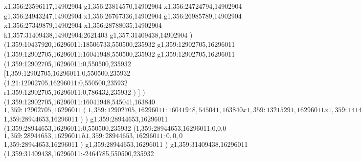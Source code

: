 {x1,356:23596117,14902904
g1,356:23814570,14902904
x1,356:24724794,14902904
g1,356:24943247,14902904
x1,356:26767336,14902904
g1,356:26985789,14902904
x1,356:27349879,14902904
x1,356:28788035,14902904
k1,357:31409438,14902904:2621403
g1,357:31409438,14902904
)
(1,359:10437920,16296011:18506733,550500,235932
g1,359:12902705,16296011
(1,359:12902705,16296011:16041948,550500,235932
g1,359:12902705,16296011
(1,359:12902705,16296011:0,550500,235932
[1,359:12902705,16296011:0,550500,235932
(1,21:12902705,16296011:0,550500,235932
r1,359:12902705,16296011:0,786432,235932
)
]
)
(1,359:12902705,16296011:16041948,545041,163840
$1,359:12902705,16296011
(1,359:12902705,16296011:16041948,545041,163840
x1,359:13215291,16296011
x1,359:14146295,16296011
g1,359:14328335,16296011
x1,359:14838061,16296011
g1,359:15020101,16296011
x1,359:15340956,16296011
x1,359:16318990,16296011
g1,359:16464622,16296011
x1,359:16974348,16296011
g1,359:17119980,16296011
[1,359:17119980,16296011:391398,545041,127431
(1,359:17261069,16123068:0,372098,0
x1,359:17588750,16123068
)
(1,359:17119980,16296011:391398,455111,127431
x1,359:17440835,16296011
)
]
x1,359:17766241,16296011
[1,359:17766241,16296011:397765,381201,0
(1,359:17801283,16286908:0,372098,0
x1,359:18128964,16286908
)
(1,359:17766241,16296011:397765,291271,0
x1,359:18164006,16296011
)
]
x1,359:18346051,16296011
g1,359:18455275,16296011
x1,359:19107903,16296011
g1,359:19289943,16296011
x1,359:19799669,16296011
g1,359:19981709,16296011
x1,359:20302564,16296011
x1,359:21280598,16296011
g1,359:21426230,16296011
x1,359:21935956,16296011
g1,359:22081588,16296011
[1,359:22081588,16296011:391398,545041,127431
(1,359:22222677,16123068:0,372098,0
x1,359:22550358,16123068
)
(1,359:22081588,16296011:391398,455111,127431
x1,359:22402443,16296011
)
]
x1,359:23125614,16296011
(1,359:23125614,16025418:301284,213447,0
x1,359:23394130,16025418
)
x1,359:23608943,16296011
g1,359:23718167,16296011
x1,359:24370795,16296011
g1,359:24552835,16296011
x1,359:25062561,16296011
g1,359:25244601,16296011
x1,359:25565456,16296011
x1,359:26543490,16296011
g1,359:26689122,16296011
x1,359:27198848,16296011
g1,359:27344480,16296011
x1,359:27665335,16296011
x1,359:28388506,16296011
(1,359:28388506,16025418:301284,213447,0
x1,359:28657022,16025418
)
x1,359:28944653,16296011
)
$1,359:28944653,16296011
)
)
g1,359:28944653,16296011
(1,359:28944653,16296011:0,550500,235932
(1,359:28944653,16296011:0,0,0
$1,359:28944653,16296011
h1,359:28944653,16296011:0,0,0
$1,359:28944653,16296011
)
g1,359:28944653,16296011
)
g1,359:31409438,16296011
(1,359:31409438,16296011:-2464785,550500,235932
}
